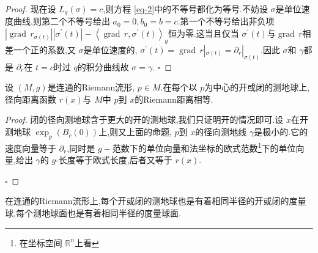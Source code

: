 \documentclass[../../几何与拓扑.tex]{subfiles}
\begin{document}
\begin{proof}
    现在设 \(  L_{g}\left(  \sigma  \right)= c   \),则方程 \ref{eq-2}中的不等号都化为等号.不妨设 \(   \sigma   \)是单位速度曲线,则第二个不等号给出 \(  a_0= 0,b_0= b= c  \).第一个不等号给出非负项  \(  \left| \operatorname{grad}\,r_{ \sigma \left( t \right) } \right|\left|  \sigma ^{\prime} \left( t \right)  \right|-\left<\operatorname{grad}\,r, \sigma ^{\prime} \left( t \right)  \right>_{g}    \)恒为零.这当且仅当 \(   \sigma ^{\prime} \left( t \right)   \)与\(  \operatorname{grad}\,r  \)相差一个正的系数,又 \(   \sigma   \)是单位速度的, \(   \sigma ^{\prime} \left( t \right)= \operatorname{grad}\,r|_{ \sigma \left( t \right) }= \partial _{r}|_{ \sigma \left( t \right) }   \).因此 \(   \sigma   \)和 \(   \gamma   \)都是 \(  \partial _{r}  \)在 \(  t= c  \)时过 \(  q  \)的积分曲线故 \(   \sigma =  \gamma   \).             
    \hfill $\square$
\end{proof}

\begin{corollary}
    设 \(  \left( M,g \right)   \)是连通的Riemann流形, \(  p \in M  \).在每个以 \(  p  \)为中心的开或闭的测地球上,径向距离函数 \(  r\left( x \right)   \)与 \(  M  \)中 \(  p  \)到 \(  x  \)的Riemann距离相等.       
\end{corollary}

\begin{proof}
    闭的径向测地球含于更大的开的测地球,我们只证明开的情况即可.设 \(  x  \)在开测地球 \(  \exp _{p}\left( B_{c}\left( 0 \right)  \right)   \)上,则又上面的命题, \(  p  \)到 \(  x  \)的径向测地线 \(   \gamma   \)是极小的.它的速度向量等于 \(  \partial _{r}  \),同时是 \(  g-  \)范数下的单位向量和法坐标的欧式范数\footnote{在坐标空间 \(  \mathbb{R} ^{n}  \)上看 }下的单位向量,给出 \(   \gamma   \)的 \(  g  \)-长度等于欧式长度,后者又等于 \(  r\left( x \right)   \).   

    \hfill $\square$
\end{proof}

\begin{corollary}
    在连通的Riemann流形上,每个开或闭的测地球也是有着相同半径的开或闭的度量球,每个测地球面也是有着相同半径的度量球面.
\end{corollary}
\end{document}
